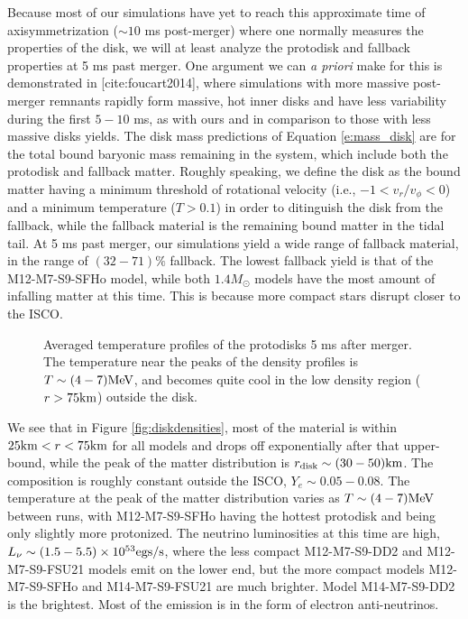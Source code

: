 Because most of our simulations have yet to reach this approximate time of axisymmetrization ($\sim 10$ ms post-merger) where one normally measures the properties of the disk, we will at least analyze the protodisk and fallback properties at 5 ms past merger.
One argument we can \textit{a priori} make for this is demonstrated in [cite:foucart2014], where simulations with more massive post-
merger remnants rapidly form massive, hot inner disks and have less variability during the first $5-10$ ms, as with ours and in comparison to those with less massive disks yields.
The disk mass predictions of Equation \ref{e:mass_disk} are for the total bound baryonic mass remaining in the system, which include both the protodisk and fallback matter.
Roughly speaking, we define the disk as the bound matter having a minimum threshold of rotational velocity (i.e., $-1 < v_r/v_\phi < 0$) and a minimum temperature ($T>0.1$) in order to ditinguish the disk from the fallback,
while the fallback material is the remaining bound matter in the tidal tail.
At 5 ms past merger, our simulations yield a wide range of fallback material, in the range of $(32 - 71)\%$ fallback.  
The lowest fallback yield is that of the M12-M7-S9-SFHo model, while both $1.4 M_\odot$ models have the most amount of infalling matter at this time.
This is because more compact stars disrupt closer to the ISCO.

\begin{figure}
	\centering
	
	\caption[Temperature profiles of the protodisks 5 ms after merger]{
		Averaged temperature profiles of the protodisks 5 ms after merger.  The temperature near the peaks of the density profiles is $T \sim (4-7) {\rm MeV}$, and becomes quite cool in the low density region ($r>75 {\rm km}$) outside the disk.  
	}
	\label{fig:disktemps}
\end{figure}

We see that in Figure \ref{fig:diskdensities}, most of the material is within 
$25 {\rm km} < r < 75{\rm km}$ for all models and drops off exponentially after that upper-bound, while the peak of the matter distribution is $r _{\rm disk} \sim (30 - 50) {\rm km}$.  
The composition is roughly constant outside the ISCO, $Y_e \sim 0.05 - 0.08$.  The temperature at the peak of the matter distribution varies as $T \sim (4-7) {\rm MeV}$ between runs, with M12-M7-S9-SFHo having the hottest protodisk and being only slightly more protonized. 
The neutrino luminosities at this time are high, $L_\nu \sim (1.5 - 5.5) \times 10^{53} {\rm egs/s}$, where the less compact M12-M7-S9-DD2 and M12-M7-S9-FSU21 models emit on the lower end, but the more compact models M12-M7-S9-SFHo  and M14-M7-S9-FSU21 are much brighter.
Model M14-M7-S9-DD2 is the brightest.
Most of the emission is in the form of electron anti-neutrinos.


